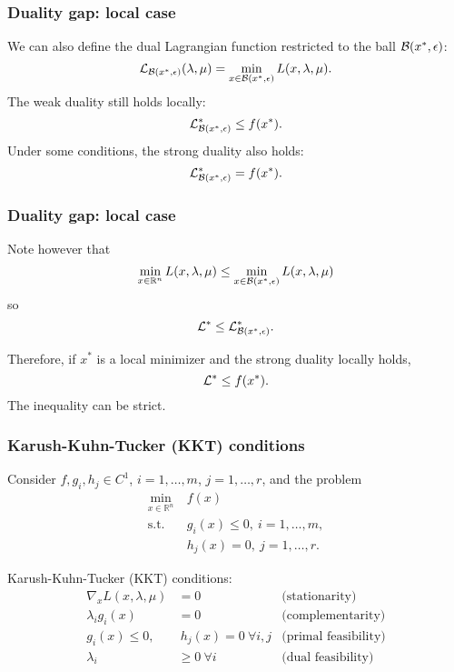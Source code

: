 \documentclass[usepdftitle=false]{beamer}
\begin{document}
\begin{frame}
\frametitle{Duality gap: local case}

We can also define the dual Lagrangian function restricted to the ball ${\mathcal{B}}(x^*, \epsilon)$:
$$
{\mathcal{L}}_{{\mathcal{B}}(x^*, \epsilon)}(\lambda, \mu) = \min_{x \in {\mathcal{B}}(x^*, \epsilon)} L(x,\lambda, \mu).
$$
The weak duality still holds locally:
$$
{\mathcal{L}}^*_{{\mathcal{B}}(x^*, \epsilon)} \leq f(x^*).
$$
Under some conditions, the strong duality also holds:
$$
{\mathcal{L}}^*_{{\mathcal{B}}(x^*, \epsilon)} = f(x^*).
$$

\end{frame}

\begin{frame}
\frametitle{Duality gap: local case}

Note however that
$$
\min_{x \in \mathbb{R}^n} L(x, \lambda, \mu) 
\leq \min_{x \in {\mathcal{B}}(x^*, \epsilon)} L(x, \lambda, \mu) 
$$
so
$$
{\mathcal{L}}^* \leq {\mathcal{L}}^*_{{\mathcal{B}}(x^*, \epsilon)}.
$$

\mbox{}

Therefore, if $x^*$ is a local minimizer and the strong duality locally holds,
$$
{\mathcal{L}}^* \leq f(x^*).
$$
The inequality can be strict.

\end{frame}

\begin{frame}
	\frametitle{Karush-Kuhn-Tucker (KKT) conditions}
	
	Consider $f, g_i, h_j \in C^1$, $i = 1,\ldots,m$, $j = 1,\ldots,r$, and the problem
	\begin{align*}
		\min_{x \in \mathbb{R}^n} \ & f(x) \\
		\mbox{s.t. } & g_i(x) \leq 0,\ i = 1,\ldots,m, \\
		& h_j(x) = 0,\ j = 1,\ldots,r.
	\end{align*}
	
	Karush-Kuhn-Tucker (KKT) conditions:
	\begin{align*}
		\nabla_x L(x,\lambda,\mu) &= 0 & \mbox{(stationarity)}\\
		\lambda_i g_i(x) &= 0 & \mbox{(complementarity)} \\
		g_i(x) \leq 0, &\ h_j(x) = 0\ \forall i,j & \mbox{(primal feasibility)} \\
		\lambda_i &\geq 0\ \forall i & \mbox{(dual feasibility)}
	\end{align*}
	
\end{frame}
\end{document}
